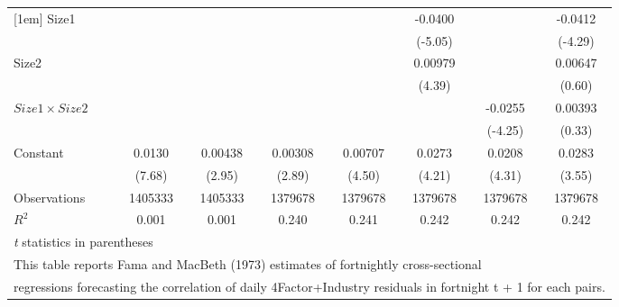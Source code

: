 {\begin{tabular}{l*{7}{c}}
[1em]
Size1               &                     &                     &                     &                     &     -0.0400\sym{***}&                     &     -0.0412\sym{***}\\
                    &                     &                     &                     &                     &     (-5.05)         &                     &     (-4.29)         \\
[1em]
Size2               &                     &                     &                     &                     &     0.00979\sym{***}&                     &     0.00647         \\
                    &                     &                     &                     &                     &      (4.39)         &                     &      (0.60)         \\
[1em]
$ Size1 \times Size2 $&                     &                     &                     &                     &                     &     -0.0255\sym{***}&     0.00393         \\
                    &                     &                     &                     &                     &                     &     (-4.25)         &      (0.33)         \\
[1em]
Constant            &      0.0130\sym{***}&     0.00438\sym{**} &     0.00308\sym{**} &     0.00707\sym{***}&      0.0273\sym{***}&      0.0208\sym{***}&      0.0283\sym{***}\\
                    &      (7.68)         &      (2.95)         &      (2.89)         &      (4.50)         &      (4.21)         &      (4.31)         &      (3.55)         \\
\hline
Observations        &     1405333         &     1405333         &     1379678         &     1379678         &     1379678         &     1379678         &     1379678         \\
\(R^{2}\)           &       0.001         &       0.001         &       0.240         &       0.241         &       0.242         &       0.242         &       0.242         \\
\hline\hline
\multicolumn{8}{l}{\footnotesize \textit{t} statistics in parentheses}\\
\multicolumn{8}{l}{\footnotesize This table reports Fama and MacBeth (1973) estimates of fortnightly cross-sectional}\\
\multicolumn{8}{l}{\footnotesize  regressions forecasting the correlation of daily 4Factor+Industry residuals in fortnight t + 1 for each pairs.}\\

\end{tabular}}
